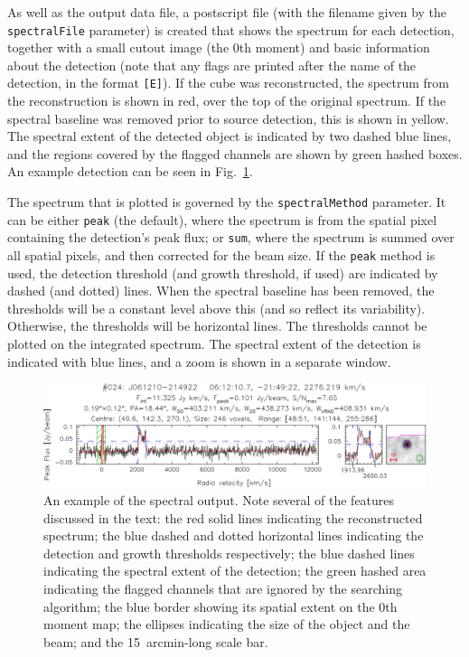 


As well as the output data file, a postscript file (with the filename
given by the \texttt{spectralFile} parameter) is created that shows
the spectrum for each detection, together with a small cutout image
(the 0th moment) and basic information about the detection (note that
any flags are printed after the name of the detection, in the format
\texttt{[E]}). If the cube was reconstructed, the spectrum from the
reconstruction is shown in red, over the top of the original
spectrum. If the spectral baseline was removed prior to source
detection, this is shown in yellow. The spectral extent of the
detected object is indicated by two dashed blue lines, and the regions
covered by the flagged channels are shown by green hashed boxes. An
example detection can be seen in Fig.~\ref{fig-spect}.

The spectrum that is plotted is governed by the
\texttt{spectralMethod} parameter. It can be either \texttt{peak} (the
default), where the spectrum is from the spatial pixel containing the
detection's peak flux; or \texttt{sum}, where the spectrum is summed
over all spatial pixels, and then corrected for the beam size. If the
\texttt{peak} method is used, the detection threshold (and growth
threshold, if used) are indicated by dashed (and dotted) lines. When
the spectral baseline has been removed, the thresholds will be a
constant level above this (and so reflect its variability). Otherwise,
the thresholds will be horizontal lines. The thresholds cannot be
plotted on the integrated spectrum. The spectral extent of the
detection is indicated with blue lines, and a zoom is shown in a
separate window.

\begin{figure}[t]
  \begin{center}
    \includegraphics[width=\textwidth]{example_spectrum}
  \end{center}
  \caption{\footnotesize An example of the spectral output. Note
    several of the features discussed in the text: the red solid lines
    indicating the reconstructed spectrum; the blue dashed and dotted
    horizontal lines indicating the detection and growth thresholds
    respectively; the blue dashed lines indicating the spectral extent
    of the detection; the green hashed area indicating the flagged
    channels that are ignored by the searching algorithm; the blue
    border showing its spatial extent on the 0th moment map; the
    ellipses indicating the size of the object and the beam; and the
    15~arcmin-long scale bar.}
  \label{fig-spect}
\end{figure}


